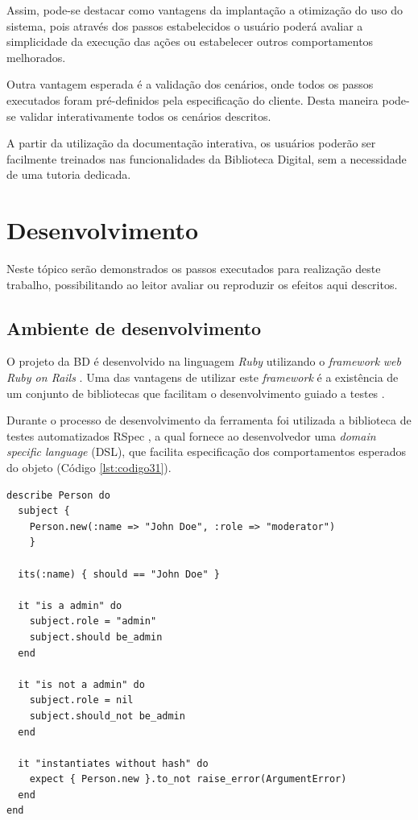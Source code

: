 Assim, pode-se destacar como vantagens da implantação a otimização do uso do sistema, pois através dos passos estabelecidos o usuário poderá avaliar a simplicidade da execução das ações ou estabelecer outros comportamentos melhorados.

Outra vantagem esperada é a validação dos cenários, onde todos os passos executados foram pré-definidos pela especificação do cliente. Desta maneira pode-se validar interativamente todos os cenários descritos.

A partir da utilização da documentação interativa, os usuários poderão ser facilmente treinados nas funcionalidades da Biblioteca Digital, sem a necessidade de uma tutoria dedicada.

\section{Desenvolvimento}

Neste tópico serão demonstrados os passos executados para realização deste trabalho, possibilitando ao leitor avaliar ou reproduzir os efeitos aqui descritos.

\subsection{Ambiente de desenvolvimento}

O projeto da BD é desenvolvido na linguagem \textit{Ruby} utilizando o \textit{framework} \textit{web Ruby on Rails} \cite{RAILS}. Uma das vantagens de utilizar este \textit{framework} é a existência de um conjunto de bibliotecas que facilitam o desenvolvimento guiado a testes \cite{BECK}.

Durante o processo de desenvolvimento da ferramenta foi utilizada a biblioteca de testes automatizados RSpec \cite{CHELIMSKY}, a qual fornece ao desenvolvedor uma \textit{domain specific language} (DSL), que facilita especificação dos comportamentos esperados do objeto (Código \ref{lst:codigo31}).

{\singlespace
\begin{lstlisting}[caption=Exemplo da DSL do Rspec,label={lst:codigo31}]
describe Person do
  subject {
    Person.new(:name => "John Doe", :role => "moderator")
    }

  its(:name) { should == "John Doe" }

  it "is a admin" do
    subject.role = "admin"
    subject.should be_admin
  end

  it "is not a admin" do
    subject.role = nil
    subject.should_not be_admin
  end

  it "instantiates without hash" do
    expect { Person.new }.to_not raise_error(ArgumentError)
  end
end
\end{lstlisting}
}

